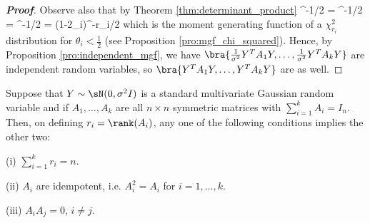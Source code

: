 \begin{proof}[\bf Proof]
Observe also that by Theorem \ref{thm:determinant_product}
\be
\det{}^{-1/2} = \det{}^{-1/2} = \det {}^{-1/2} = (1-2\theta_i)^{-r_i/2}
\ee
which is the moment generating function of a $\chi^2_{r_i}$ distribution for $\theta_i < \frac 12$ (see Proposition \ref{pro:mgf_chi_squared}). Hence, by Proposition \ref{pro:independent_mgf}, we have $\bra{\frac 1{\sigma^2}Y^T A_1Y, \dots, \frac 1{\sigma^2}Y^TA_kY}$ are independent random variables, so $\bra{Y^TA_1Y, \dots, Y^TA_kY}$ are as well.
\end{proof}

\begin{theorem}\label{thm:cochran_equivalence}
Suppose that $Y\sim \sN(0,\sigma^2 I)$ is a standard multivariate Gaussian random variable and if $A_1,\dots,A_k$ are all $n\times n$ symmetric matrices with $\sum^k_{i=1}A_i = I_n$. Then, on defining $r_i = \rank(A_i)$, any one of the following conditions implies the other two:
\ben
\item [(i)] $\sum^k_{i=1}r_i = n$.
\item [(ii)] $A_i$ are idempotent, i.e. $A_i^2 = A_i$ for $i = 1,\dots, k$.
\item [(iii)] $A_iA_j =0$, $i\neq j$.
\een
\end{theorem}

